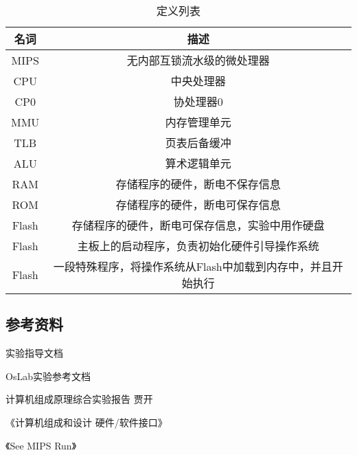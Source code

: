         \begin{table}[!hbp]
        \centering
        \caption{定义列表}
        \begin{tabular}{|c|c|}
        \hline
        名词 & 描述　\\
        \hline
        MIPS & 无内部互锁流水级的微处理器 \\
        \hline
        CPU &  中央处理器\\
        \hline
        CP0 & 协处理器0 \\
        \hline
        MMU & 内存管理单元 \\
        \hline
        TLB & 页表后备缓冲 \\
        \hline
        ALU & 算术逻辑单元 \\
        \hline
        RAM & 存储程序的硬件，断电不保存信息 \\
        \hline
        ROM & 存储程序的硬件，断电可保存信息 \\
        \hline
        Flash & 存储程序的硬件，断电可保存信息，实验中用作硬盘 \\
        \hline
        Flash & 主板上的启动程序，负责初始化硬件引导操作系统 \\
        \hline
        Flash & 一段特殊程序，将操作系统从Flash中加载到内存中，并且开始执行 \\
        \hline
        \end{tabular}
        \end{table}

    \subsection{参考资料}
        实验指导文档

        OsLab实验参考文档

        计算机组成原理综合实验报告 贾开

        《计算机组成和设计 硬件/软件接口》

        《See MIPS Run》


